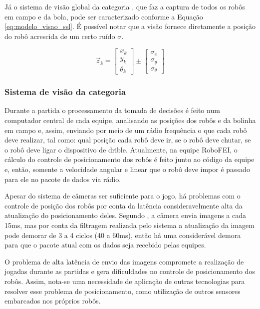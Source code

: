 \documentclass[acronym, symbols, table]{fei}
\begin{document}
		Já o sistema de visão global da categoria , que faz a captura de todos os robôs em campo e da bola, pode ser caracterizado conforme a Equação \ref{eq:modelo_visao_ssl}. É possível notar que a visão fornece diretamente a posição do robô acrescida de um certo ruído $\sigma$.
		
		\begin{equation}\label{eq:modelo_visao_ssl}
			\overrightarrow{z}_k  = 
			\begin{bmatrix}
				x_k \\
				y_k \\
				\theta_k
			\end{bmatrix} \pm
			\begin{bmatrix}
				\sigma_x \\
				\sigma_y \\
				\sigma_{\theta}
			\end{bmatrix}
		\end{equation}
		
		\subsubsection{Sistema de visão da categoria }
		
			Durante a partida o processamento da tomada de decisões é feito num computador central de cada equipe, analisando as posições dos robôs e da bolinha em campo e, assim, enviando por meio de um rádio frequência o que cada robô deve realizar, tal como: qual posição cada robô deve ir, se o robô deve chutar, se o robô deve ligar o dispositivo de drible. Atualmente, na equipe RoboFEI, o cálculo do controle de posicionamento dos robôs é feito junto ao código da equipe e, então, somente a velocidade angular e linear que o robô deve impor é passado para ele no pacote de dados via rádio.
		
			Apesar do sistema de câmeras ser suficiente para o jogo, há problemas com o controle de posição dos robôs por conta da latência consideravelmente alta da atualização do posicionamento deles. Segundo \textcite{tdpZJUNlict2020}, a câmera envia imagens a cada 15ms, mas por conta da filtragem realizada pelo sistema a atualização da imagem pode demorar de 3 a 4 ciclos (40 a 60ms), então há uma considerável demora para que o pacote atual com os dados seja recebido pelas equipes.
			
			O problema de alta latência de envio das imagens compromete a realização de jogadas durante as partidas e gera dificuldades no controle de posicionamento dos robôs. Assim, nota-se uma necessidade de aplicação de outras tecnologias para resolver esse problema de posicionamento, como utilização de outros sensores embarcados nos próprios robôs.
			
\end{document}
